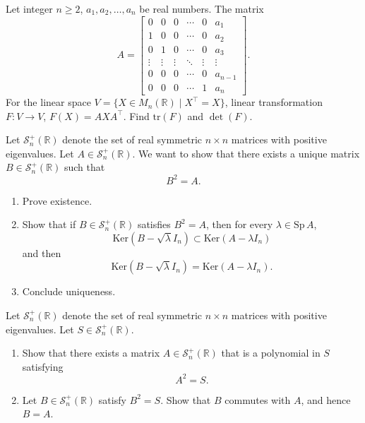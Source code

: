 \documentclass[12pt]{article}
\begin{document}
\begin{problem}
Let integer $n \geq 2$, $a_1, a_2, \ldots, a_n$ be real numbers. The matrix
\[
A = \begin{bmatrix}
0 & 0 & 0 & \cdots & 0 & a_1 \\
1 & 0 & 0 & \cdots & 0 & a_2 \\
0 & 1 & 0 & \cdots & 0 & a_3 \\
\vdots & \vdots & \vdots & \ddots & \vdots & \vdots \\
0 & 0 & 0 & \cdots & 0 & a_{n-1} \\
0 & 0 & 0 & \cdots & 1 & a_n
\end{bmatrix}.
\]
For the linear space $V = \{X \in M_n(\mathbb{R}) \mid X^\top = X\}$, linear transformation $F : V \to V$, $F(X) = AXA^\top$. Find $\mathrm{tr}(F)$ and $\det(F)$.
\end{problem}

\begin{problem}
Let $\mathcal{S}_n^+(\mathbb{R})$ denote the set of real symmetric $n\times n$ matrices with positive eigenvalues.
Let $A \in \mathcal{S}_n^+(\mathbb{R})$. We want to show that there exists a unique matrix $B \in \mathcal{S}_n^+(\mathbb{R})$ such that
\[
B^2 = A.
\]
\begin{enumerate}[label=(\alph*)]
\item Prove existence.
\item Show that if $B \in \mathcal{S}_n^+(\mathbb{R})$ satisfies $B^2 = A$, then for every $\lambda \in \mathrm{Sp}\, A$,
\[
\mathrm{Ker}(B - \sqrt{\lambda} I_n) \subset \mathrm{Ker}(A - \lambda I_n)
\]
and then
\[
\mathrm{Ker}(B - \sqrt{\lambda} I_n) = \mathrm{Ker}(A - \lambda I_n).
\]
\item Conclude uniqueness.
\end{enumerate}
\end{problem}

\begin{problem}
Let $\mathcal{S}_n^+(\mathbb{R})$ denote the set of real symmetric $n\times n$ matrices with positive eigenvalues. Let $S \in \mathcal{S}_n^+(\mathbb{R})$.
\begin{enumerate}[label=(\alph*)]
\item Show that there exists a matrix $A \in \mathcal{S}_n^+(\mathbb{R})$ that is a polynomial in $S$ satisfying
\[
A^2 = S.
\]
\item Let $B \in \mathcal{S}_n^+(\mathbb{R})$ satisfy $B^2 = S$. Show that $B$ commutes with $A$, and hence $B = A$.
\end{enumerate}
\end{problem}
\end{document}
